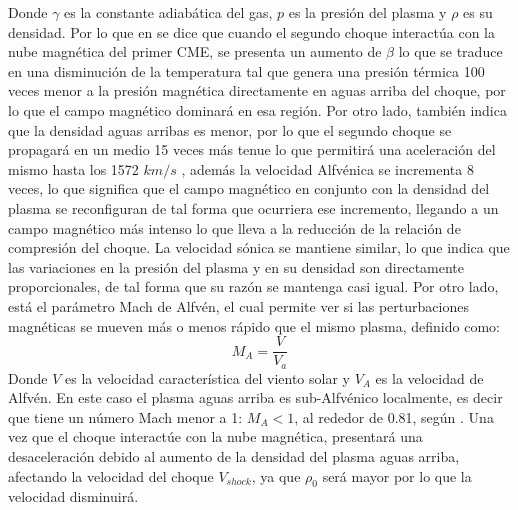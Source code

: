 \begin{itemize}
\begin{itemize}
Donde $\gamma$ es la constante adiabática del gas, $p$ es la presión del plasma y $\rho$ es su densidad. Por lo que en \cite{lugaz-2005} se dice que cuando el segundo choque interactúa con la nube magnética del primer CME, se presenta un aumento de $\beta$ lo que se traduce en una disminución de la temperatura tal que genera una presión térmica 100 veces menor a la presión magnética directamente en aguas arriba del choque, por lo que el campo magnético dominará en esa región. Por otro lado, también indica que la densidad aguas arribas es menor, por lo que el segundo choque se propagará en un medio 15 veces más tenue lo que permitirá una aceleración del mismo hasta los 1572 $km/s$ , además la velocidad Alfvénica se incrementa 8 veces, lo que significa que el campo magnético en conjunto con la densidad del plasma se reconfiguran de tal forma que ocurriera ese incremento, llegando a un campo magnético más intenso lo que lleva a la reducción de la relación de compresión del choque. La velocidad sónica se mantiene similar, lo que indica que las variaciones en la presión del plasma y en su densidad son directamente proporcionales, de tal forma que su razón se mantenga casi igual. 
Por otro lado, está el parámetro Mach de Alfvén, el cual permite ver si las perturbaciones magnéticas se mueven más o menos rápido que el mismo plasma, definido como:
\begin{equation}
M_{A}=\frac{V}{V_{a}}
\end{equation}
Donde $V$ es la velocidad característica del viento solar y \hyperref[Valfvenica]{$V_A$} es la velocidad de Alfvén. En este caso el plasma aguas arriba es sub-Alfvénico localmente, es decir que tiene un número Mach menor a 1: $M_A<1$, al rededor de 0.81, según \cite{lugaz-2005}.
Una vez que el choque interactúe con la nube magnética, presentará una desaceleración debido al aumento de la densidad del plasma aguas arriba, afectando la velocidad del choque \hyperref[Vshock]{$V_{shock}$}, ya que $\rho_0$ será mayor por lo que la velocidad disminuirá.


\end{itemize}
\end{itemize}
